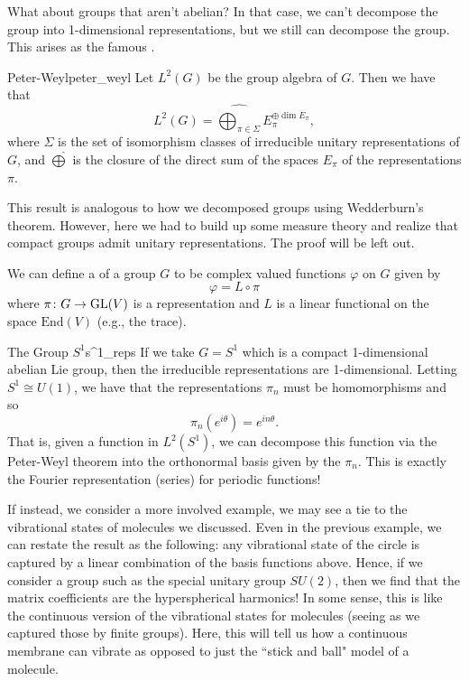 What about groups that aren't abelian? In that case, we can't decompose the group into 1-dimensional representations, but we still can decompose the group.  This arises as the famous .  

\begin{thm}{Peter-Weyl}{peter_weyl}
    Let $L^2(G)$ be the group algebra of $G$.  Then we have that
    \[
    L^2(G)=\widehat{\bigoplus_{\pi \in \Sigma}} E_\pi^{\oplus \dim E_\pi},
    \]
    where $\Sigma$ is the set of isomorphism classes of irreducible unitary representations of $G$, and $\widehat{\bigoplus}$ is the closure of the direct sum of the spaces $E_\pi$ of the representations $\pi$. 
\end{thm}

This result is analogous to how we decomposed groups using Wedderburn's theorem. However, here we had to build up some measure theory and realize that compact groups admit unitary representations.  The proof will be left out.

We can define a  of a group $G$ to be complex valued functions $\varphi$ on $G$ given by 
\[
\varphi = L \circ \pi
\]
where $\pi\colon G \to \mathrm{GL}(V)$ is a representation and $L$ is a linear functional on the space $\mathrm{End}(V)$ (e.g., the trace).

\begin{ex}{The Group $S^1$}{s^1_reps}
    If we take $G=S^1$ which is a compact 1-dimensional abelian Lie group, then the irreducible representations are 1-dimensional. Letting $S^1\cong U(1)$, we have that the representations $\pi_n$ must be homomorphisms and so
    \[
    \pi_n(e^{i\theta})=e^{in\theta}.
    \]
    That is, given a function in $L^2(S^1)$, we can decompose this function via the Peter-Weyl theorem into the orthonormal basis given by the $\pi_n$. This is exactly the Fourier representation (series) for periodic functions!
\end{ex}

If instead, we consider a more involved example, we may see a tie to the vibrational states of molecules we discussed. Even in the previous example, we can restate the result as the following: any vibrational state of the circle is captured by a linear combination of the basis functions above.  Hence, if we consider a group such as the special unitary group $SU(2)$, then we find that the matrix coefficients are the hyperspherical harmonics! In some sense, this is like the continuous version of the vibrational states for molecules (seeing as we captured those by finite groups).  Here, this will tell us how a continuous membrane can vibrate as opposed to just the ``stick and ball" model of a molecule.

